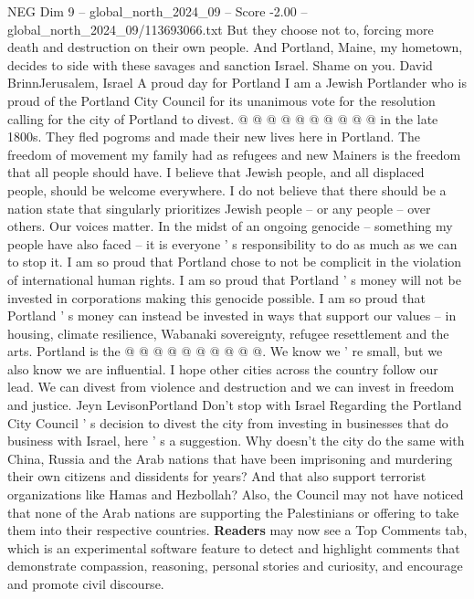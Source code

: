 \begin{textsample}{NEG Dim 9 – global\_north\_2024\_09 – Score -2.00 – global\_north\_2024\_09/113693066.txt}
But they choose not to, forcing more death and destruction on their own people.
And Portland, Maine, my hometown, decides to side with these savages and sanction Israel.
Shame on you.
David BrinnJerusalem, Israel A proud day for Portland I am a Jewish Portlander who is proud of the Portland City Council for its unanimous vote for the resolution calling for the city of Portland to divest. @ @ @ @ @ @ @ @ @ @ in the late 1800s.
They fled pogroms and made their new lives here in Portland.
The freedom of movement my family had as refugees and new Mainers is the freedom that all people should have.
I believe that Jewish people, and all displaced people, should be welcome everywhere.
I do not believe that there should be a nation state that singularly prioritizes Jewish people -- or any people -- over others.
Our voices matter.
In the midst of an ongoing genocide -- something my people have also faced -- it is everyone ' s responsibility to do as much as we can to stop it.
I am so proud that Portland chose to not be complicit in the violation of international human rights.
I am so proud that Portland ' s money will not be invested in corporations making this genocide possible.
I am so proud that Portland ' s money can instead be invested in ways that support our values -- in housing, climate resilience, Wabanaki sovereignty, refugee resettlement and the arts.
Portland is the @ @ @ @ @ @ @ @ @ @.
We know we ' re small, but we also know we are influential.
I hope other cities across the country follow our lead.
We can divest from violence and destruction and we can invest in freedom and justice.
Jeyn LevisonPortland Don't stop with Israel Regarding the Portland City Council ' s decision to divest the city from investing in businesses that do business with Israel, here ' s a suggestion.
Why doesn't the city do the same with China, Russia and the Arab nations that have been imprisoning and murdering their own citizens and dissidents for years?
And that also support terrorist organizations like Hamas and Hezbollah?
Also, the Council may not have noticed that none of the Arab nations are supporting the Palestinians or offering to take them into their respective countries. \textbf{Readers} may now see a Top Comments tab, which is an experimental software feature to detect and highlight comments that demonstrate compassion, reasoning, personal stories and curiosity, and encourage and promote civil discourse.

\end{textsample}
